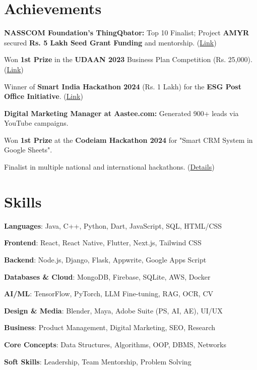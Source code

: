 \documentclass[a4paper]{article}
\newcommand{\resumeItem}[2]{
  \item\small{
    \textbf{#1}{: #2 \vspace{-2pt}}
  }
}
\newcommand{\resumeSubItem}[2]{\resumeItem{#1}{#2}\vspace{-4pt}}
\begin{document}
\section{Achievements}
\begin{resumeSubHeadingList}
  \item{\textbf{NASSCOM Foundation's ThingQbator:} Top 10 Finalist; Project \textbf{AMYR} secured \textbf{Rs. 5 Lakh Seed Grant Funding} and mentorship. (\href{https://thingqbator.nasscomfoundation.org/main/programdetailview}{Link})}
  \item{Won \textbf{1st Prize} in the \textbf{UDAAN 2023} Business Plan Competition (Rs. 25,000). (\href{https://drive.google.com/file/d/1woODQZURLzt9RRNwFlzw0onOX_-S1DaB/view}{Link})}
  \item{Winner of \textbf{Smart India Hackathon 2024} (Rs. 1 Lakh) for the \textbf{ESG Post Office Initiative}. (\href{https://fhaida.medium.com/post4planet-transforming-indian-postal-services-4d4e6470c51e}{Link})}
  \item{\textbf{Digital Marketing Manager at Aastee.com:} Generated 900+ leads via YouTube campaigns.}
  \item{Won \textbf{1st Prize} at the \textbf{Codeiam Hackathon 2024} for "Smart CRM System in Google Sheets".}
  \item{Finalist in multiple national and international hackathons. (\href{https://ssrao22.notion.site/}{Details})}
\end{resumeSubHeadingList}

\section{Skills}
\begin{multicols}{3}
    \begin{resumeSubHeadingList}
        \resumeSubItem{Languages}{Java, C++, Python, Dart, JavaScript, SQL, HTML/CSS}
        \resumeSubItem{Frontend}{React, React Native, Flutter, Next.js, Tailwind CSS}
        \resumeSubItem{Backend}{Node.js, Django, Flask, Appwrite, Google Apps Script}
        \resumeSubItem{Databases \& Cloud}{MongoDB, Firebase, SQLite, AWS, Docker}
        \resumeSubItem{AI/ML}{TensorFlow, PyTorch, LLM Fine-tuning, RAG, OCR, CV}
        \resumeSubItem{Design \& Media}{Blender, Maya, Adobe Suite (PS, AI, AE), UI/UX}
        \resumeSubItem{Business}{Product Management, Digital Marketing, SEO, Research}
        \resumeSubItem{Core Concepts}{Data Structures, Algorithms, OOP, DBMS, Networks}
        \resumeSubItem{Soft Skills}{Leadership, Team Mentorship, Problem Solving}
    \end{resumeSubHeadingList}
\end{multicols}
\end{document}
